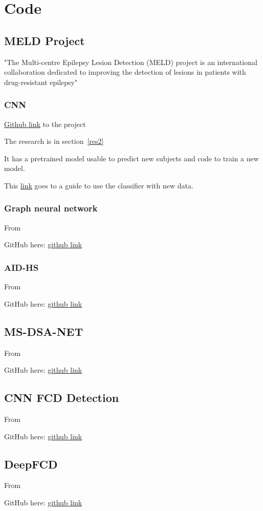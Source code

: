 \chapter{Code}

\section{MELD Project}

"The Multi-centre Epilepsy Lesion Detection (MELD) project is an international collaboration dedicated to improving the detection of lesions in patients with drug-resistant epilepsy"

\subsection{CNN}
\label{code:res2}

\href{https://github.com/MELDProject/meld_classifier}{Github link} to the project

The research is in section~\ref{res2}

It has a pretrained model usable to predict new subjects and code to train a new model.

This \href{https://docs.google.com/document/d/1vF5U1i-B45OkE_8wdde8yHHypp6W9xNN_1DBoEGmn0E/edit?tab=t.0}{link} goes to a guide to use the classifier with new data.

\subsection{Graph neural network}
\label{code:res13}

From 

GitHub here: \href{https://github.com/meldproject/meld_graph?tab=readme-ov-file}{github link}

\subsection{AID-HS}
\label{code:hs1}

From 

GitHub here: \href{https://github.com/MELDproject/AID-HS}{github link}

\section{MS-DSA-NET}
\label{code:res8}

From 

GitHub here: \href{https://github.com/zhangxd0530/MS-DSA-NET}{github link}

\section{CNN FCD Detection}
\label{code:res16}

From 

GitHub here: \href{https://github.com/alievrusik/cnn_fcd_detection}{github link}

\section{DeepFCD}
\label{code:res18}

From 

GitHub here: \href{https://github.com/NOEL-MNI/deepFCD}{github link}
